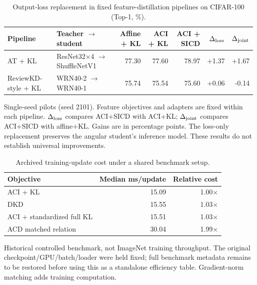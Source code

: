 \begin{table}[t]
\centering
\small
\setlength{\tabcolsep}{5pt}
\caption{Output-loss replacement in fixed feature-distillation pipelines on CIFAR-100 (Top-1, \%).}
\label{tab:dropin}
\begin{tabular}{llrrrrr}
\toprule
Pipeline & Teacher $\to$ student & Affine + KL & ACI + KL & ACI + SICD & $\Delta_{\rm loss}$ & $\Delta_{\rm joint}$ \\
\midrule
AT + KL & ResNet32$\times$4 $\to$ ShuffleNetV1 & 77.30 & 77.60 & 78.97 & +1.37 & +1.67 \\
ReviewKD-style + KL & WRN40-2 $\to$ WRN40-1 & 75.74 & 75.54 & 75.60 & +0.06 & -0.14 \\
\bottomrule
\end{tabular}
\par\smallskip
\begin{minipage}{0.96\textwidth}\footnotesize
Single-seed pilots (seed 2101). Feature objectives and adapters are fixed within each pipeline. $\Delta_{\rm loss}$ compares ACI+SICD with ACI+KL; $\Delta_{\rm joint}$ compares ACI+SICD with affine+KL. Gains are in percentage points. The loss-only replacement preserves the angular student's inference model. These results do not establish universal improvements.
\end{minipage}
\end{table}

\begin{table}[t]
\centering
\small
\setlength{\tabcolsep}{5pt}
\caption{Archived training-update cost under a shared benchmark setup.}
\label{tab:training_cost}
\begin{tabular}{lrr}
\toprule
Objective & Median ms/update & Relative cost \\
\midrule
ACI + KL & 15.09 & 1.00$\times$ \\
DKD & 15.55 & 1.03$\times$ \\
ACI + standardized full KL & 15.51 & 1.03$\times$ \\
ACD matched relation & 30.04 & 1.99$\times$ \\
\bottomrule
\end{tabular}
\par\smallskip
\begin{minipage}{0.96\textwidth}\footnotesize
Historical controlled benchmark, not ImageNet training throughput. The original checkpoint/GPU/batch/loader were held fixed; full benchmark metadata remains to be restored before using this as a standalone efficiency table. Gradient-norm matching adds training computation.
\end{minipage}
\end{table}

